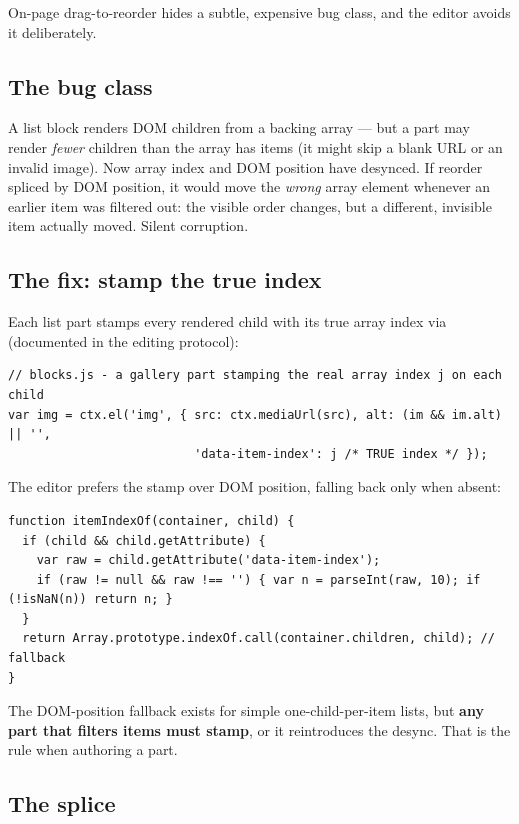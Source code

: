 \documentclass[11pt]{article}
\begin{document}
On-page drag-to-reorder hides a subtle, expensive bug class, and the editor avoids
it deliberately.

\subsection{The bug class}

A list block renders DOM children from a backing array --- but a part may render
\emph{fewer} children than the array has items (it might skip a blank URL or an
invalid image). Now array index and DOM position have desynced. If reorder spliced
by DOM position, it would move the \emph{wrong} array element whenever an earlier
item was filtered out: the visible order changes, but a different, invisible item
actually moved. Silent corruption.

\subsection{The fix: stamp the true index}

Each list part stamps every rendered child with its true array index via
 (documented in the  editing protocol):

\begin{lstlisting}
// blocks.js - a gallery part stamping the real array index j on each child
var img = ctx.el('img', { src: ctx.mediaUrl(src), alt: (im && im.alt) || '',
                          'data-item-index': j /* TRUE index */ });
\end{lstlisting}

The editor prefers the stamp over DOM position, falling back only when absent:

\begin{lstlisting}
function itemIndexOf(container, child) {
  if (child && child.getAttribute) {
    var raw = child.getAttribute('data-item-index');
    if (raw != null && raw !== '') { var n = parseInt(raw, 10); if (!isNaN(n)) return n; }
  }
  return Array.prototype.indexOf.call(container.children, child); // fallback
}
\end{lstlisting}

The DOM-position fallback exists for simple one-child-per-item lists, but
\textbf{any part that filters items must stamp}, or it reintroduces the desync.
That is the rule when authoring a part.

\subsection{The splice}
\end{document}
